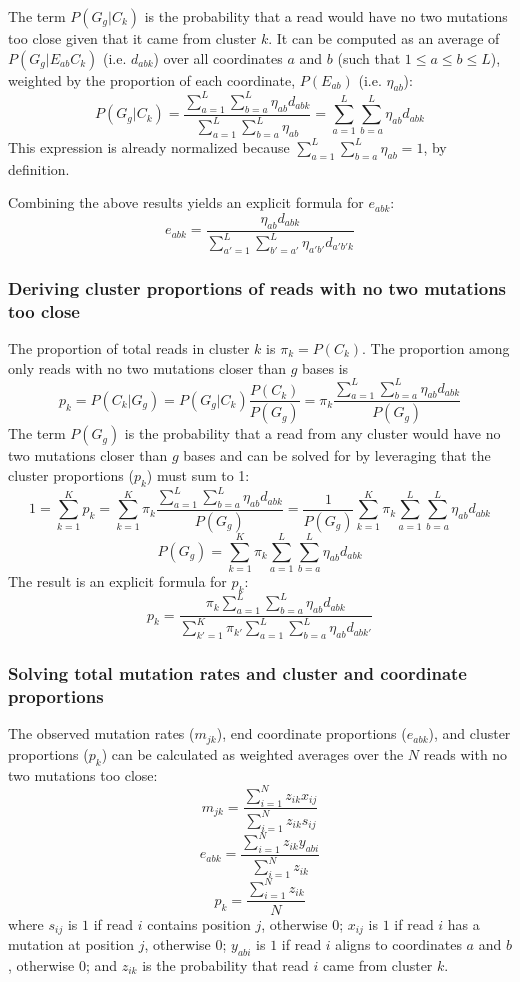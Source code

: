 \documentclass[../../MainTexts/main.tex]{subfiles}
\begin{document}
The term $P(G_g | C_k)$ is the probability that a read would have no two mutations too close given that it came from cluster $k$.
It can be computed as an average of $P(G_g | E_{ab} C_k)$ (i.e. $d_{abk}$) over all coordinates $a$ and $b$ (such that $1 \le a \le b \le L$), weighted by the proportion of each coordinate, $P(E_{ab})$ (i.e. $\eta_{ab}$):
$$P(G_g | C_k) = \frac{\sum_{a=1}^{L} \sum_{b=a}^{L} \eta_{ab} d_{abk}}{\sum_{a=1}^{L} \sum_{b=a}^{L} \eta_{ab}} = \sum_{a=1}^{L} \sum_{b=a}^{L} \eta_{ab} d_{abk}$$
This expression is already normalized because $\sum_{a=1}^{L} \sum_{b=a}^{L} \eta_{ab} = 1$, by definition.

Combining the above results yields an explicit formula for $e_{abk}$:
$$e_{abk} = \frac{\eta_{ab} d_{abk}}{\sum_{a'=1}^{L} \sum_{b'=a'}^{L} \eta_{a'b'} d_{a'b'k}}$$

\subsubsection{Deriving cluster proportions of reads with no two mutations too close}
\label{calc_p_clust_noclose}

The proportion of total reads in cluster $k$ is $\pi_k = P(C_k)$.
The proportion among only reads with no two mutations closer than $g$ bases is
$$p_k = P(C_k | G_g) = P(G_g | C_k) \frac{P(C_k)}{P(G_g)} = \pi_k \frac{\sum_{a=1}^{L} \sum_{b=a}^{L} \eta_{ab} d_{abk}}{P(G_g)}$$
The term $P(G_g)$ is the probability that a read from any cluster would have no two mutations closer than $g$ bases and can be solved for by leveraging that the cluster proportions ($p_k$) must sum to 1:
$$1 = \sum_{k=1}^{K} p_k = \sum_{k=1}^{K} \pi_k \frac{\sum_{a=1}^{L} \sum_{b=a}^{L} \eta_{ab} d_{abk}}{P(G_g)} = \frac{1}{{P(G_g)}} \sum_{k=1}^{K} \pi_k \sum_{a=1}^{L} \sum_{b=a}^{L} \eta_{ab} d_{abk}$$
$$P(G_g) = \sum_{k=1}^{K} \pi_k \sum_{a=1}^{L} \sum_{b=a}^{L} \eta_{ab} d_{abk}$$
The result is an explicit formula for $p_k$:
$$p_k = \frac{\pi_k \sum_{a=1}^{L} \sum_{b=a}^{L} \eta_{ab} d_{abk}}{\sum_{k'=1}^{K} \pi_{k'} \sum_{a=1}^{L} \sum_{b=a}^{L} \eta_{ab} d_{abk'}}$$

\subsubsection{Solving total mutation rates and cluster and coordinate proportions}
\label{calc_params}

The observed mutation rates ($m_{jk}$), end coordinate proportions ($e_{abk}$), and cluster proportions ($p_k$) can be calculated as weighted averages over the $N$ reads with no two mutations too close:
$$m_{jk} = \frac{\sum_{i=1}^{N} z_{ik} x_{ij}}{\sum_{i=1}^{N} z_{ik} s_{ij}}$$
$$e_{abk} = \frac{\sum_{i=1}^{N} z_{ik} y_{abi}}{\sum_{i=1}^{N} z_{ik}}$$
$$p_k = \frac{\sum_{i=1}^{N} z_{ik}}{N}$$
where $s_{ij}$ is $1$ if read $i$ contains position $j$, otherwise $0$; $x_{ij}$ is $1$ if read $i$ has a mutation at position $j$, otherwise $0$; $y_{abi}$ is $1$ if read $i$ aligns to coordinates $a$ and $b$, otherwise $0$; and $z_{ik}$ is the probability that read $i$ came from cluster $k$.
\end{document}
